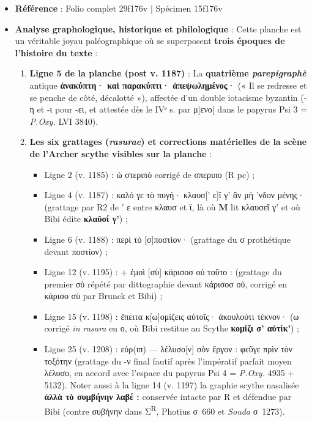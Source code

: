\documentclass[11pt, a4paper, twoside]{article}
\renewcommand{\_}{\origunderscore\penalty0\relax}
\renewcommand{\texttt}[1]{#1}
\newcommand{\R}{\textbf{R}}
\newcommand{\Rpc}{\textbf{R}\textsuperscript{pc}}
\newcommand{\Rdeux}{\textbf{R}\textsuperscript{2}}
\newcommand{\M}{\textbf{M}}
\newcommand{\Bibi}{\textit{Bibi}}
\newcommand{\PsiTrois}{\textgreek{Ψ}\textsuperscript{3}}
\newcommand{\PsiQuatre}{\textgreek{Ψ}\textsuperscript{4}}
\newcommand{\inRas}[2]{[\kern-0.15em[#1]\kern-0.15em]#2}
\def\R{R}%
\def\Rpc{R pc}%
\def\Rdeux{R2}%
\def\Bibi{Bibi}%
\def\PsiTrois{Psi 3}%
\def\PsiQuatre{Psi 4}%
\def\inRas#1#2{[#1]#2}%
\begin{document}
\begin{itemize}[leftmargin=1.5em, itemsep=2pt]
  \item \textbf{Référence} : Folio complet \texttt{29\_f176v} | Spécimen \texttt{15\_f176v}
  \item \textbf{Analyse graphologique, historique et philologique} :
  Cette planche est un véritable joyau paléographique où se superposent \textbf{trois époques de l'histoire du texte} :
  \begin{enumerate}[leftmargin=1.6em, itemsep=2pt]
  \item \textbf{Ligne 5 de la planche (post \texttt{v. 1187})} : La \textbf{quatrième \textit{parepigraphè}} antique \textbf{\texttt{ἀνακύπτη· καὶ παρακύπτι· ἀπεψωλημένος·}} (« Il se redresse et se penche de côté, décalotté »), affectée d'un double iotacisme byzantin (-η et -ι pour -ει, et attestée dès le IVᵉ s. par \texttt{μ]ενο[} dans le papyrus \PsiTrois{} = \textit{P.Oxy.} LVI 3840).
  \item \textbf{Les six grattages (\textit{rasurae}) et corrections matérielles de la scène de l'Archer scythe visibles sur la planche} :
  \begin{itemize}[leftmargin=1.5em, itemsep=2pt]
    \item Ligne 2 (\texttt{v. 1185}) : \texttt{ὡ στεριπὸ} corrigé de \texttt{σπεριπο} (\Rpc{}) ;
    \item Ligne 4 (\texttt{v. 1187}) : \texttt{καλό γε τὸ πυγή· κλαυσ\inRas{' ε}{}ϊ γ' ἂν μὴ 'νδον μένης·} (grattage par \Rdeux{} de \texttt{' ε} entre \texttt{κλαυσ} et \texttt{ϊ}, là où \M{} lit \texttt{κλαυσεῖ γ'} et où \Bibi{} édite \textbf{\texttt{κλαῦσί γ'}}) ;
    \item Ligne 6 (\texttt{v. 1188}) : \texttt{περὶ τὸ \inRas{σ}{}ποστίον·} (grattage du σ prothétique devant \texttt{ποστίον}) ;
    \item Ligne 12 (\texttt{v. 1195}) : \texttt{+ ἐμοὶ \inRas{σὺ}{} κάρισοσ οὐ τοῦτο :} (grattage du premier \texttt{σὺ} répété par dittographie devant \texttt{κάρισοσ οὐ}, corrigé en \texttt{κάρισο σὺ} par Brunck et \Bibi{}) ;
    \item Ligne 15 (\texttt{v. 1198}) : \texttt{ἔπειτα κ\inRas{ω}{ο}μίζεις αὐτοῖς· ἀκουλούτι τέκνον·} (ω corrigé \textit{in rasura} en ο, où \Bibi{} restitue au Scythe \textbf{\texttt{κομίζι σ' αὐτίκ'}}) ;
    \item Ligne 25 (\texttt{v. 1208}) : \texttt{εὐρ(ιπ) — λέλυσο\inRas{ν}{} σὸν ἔργον : φεῦγε πρὶν τὸν τοξότην} (grattage du -ν final fautif après l'impératif parfait moyen \texttt{λέλυσο}, en accord avec l'espace du papyrus \PsiQuatre{} = \textit{P.Oxy.} 4935 + 5132). Noter aussi à la ligne 14 (\texttt{v. 1197}) la graphie scythe nasalisée \textbf{\texttt{ἀλλὰ τὸ συμβήνην λαβέ :}} conservée intacte par \R{} et défendue par \Bibi{} (contre \texttt{συβήνην} dans Σ\textsuperscript{R}, Photius σ~660 et \textit{Souda} σ~1273).

\end{itemize}
\end{enumerate}
\end{itemize}
\end{document}
